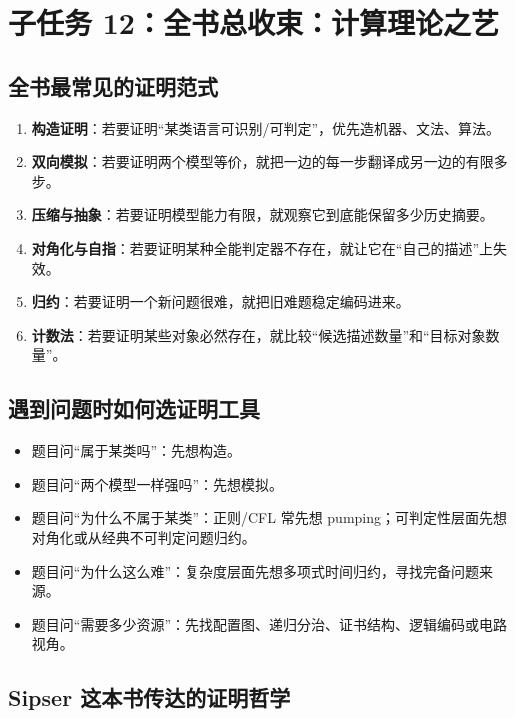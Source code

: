 \section{子任务 12：全书总收束：计算理论之艺}

\subsection{全书最常见的证明范式}

\begin{enumerate}[leftmargin=2em]
  \item \textbf{构造证明}：若要证明“某类语言可识别/可判定”，优先造机器、文法、算法。
  \item \textbf{双向模拟}：若要证明两个模型等价，就把一边的每一步翻译成另一边的有限多步。
  \item \textbf{压缩与抽象}：若要证明模型能力有限，就观察它到底能保留多少历史摘要。
  \item \textbf{对角化与自指}：若要证明某种全能判定器不存在，就让它在“自己的描述”上失效。
  \item \textbf{归约}：若要证明一个新问题很难，就把旧难题稳定编码进来。
  \item \textbf{计数法}：若要证明某些对象必然存在，就比较“候选描述数量”和“目标对象数量”。
\end{enumerate}

\subsection{遇到问题时如何选证明工具}

\begin{itemize}[leftmargin=2em]
  \item 题目问“属于某类吗”：先想构造。
  \item 题目问“两个模型一样强吗”：先想模拟。
  \item 题目问“为什么不属于某类”：正则/CFL 常先想 pumping；可判定性层面先想对角化或从经典不可判定问题归约。
  \item 题目问“为什么这么难”：复杂度层面先想多项式时间归约，寻找完备问题来源。
  \item 题目问“需要多少资源”：先找配置图、递归分治、证书结构、逻辑编码或电路视角。
\end{itemize}

\subsection{Sipser 这本书传达的证明哲学}

